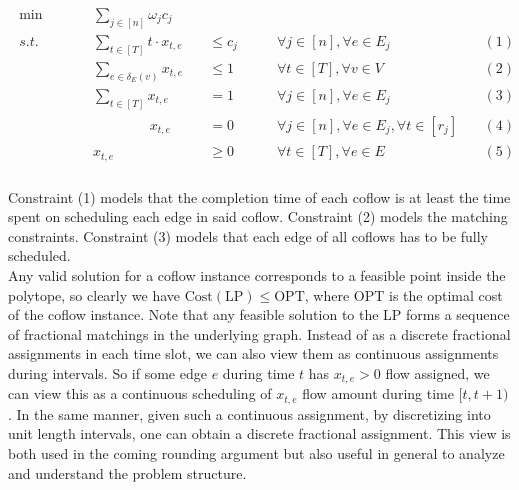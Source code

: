 \documentclass[11pt]{article}
\begin{document}
\begin{gather*}\label{lp:deadlines}\tag{LP D}
\begin{aligned}
\min\qquad &&\sum_{j \in [n]} \omega_jc_j  &~&&~\\
s.t.\qquad &&\sum_{t \in [T]}t\cdot x_{t,e} &\quad\le c_j \qquad&\forall j \in [n], \forall e \in E_j&& (1)\\
~&&\sum_{e \in \delta_E(v)}x_{t,e} &\quad\le 1\qquad &\forall t \in [T],\forall v \in V && (2)\\
~&&\sum_{t \in [T]} x_{t,e} &\quad= 1\qquad &\forall j \in [n], \forall e \in E_j && (3)\\
~&&\phantom{\sum_{x \in [T]}}x_{t,e} &\quad =  0\qquad &\forall j \in [n], \forall e \in E_j, \forall t \in [r_j] && (4)\\
~&&x_{t,e} &\quad\ge 0\qquad &\forall t \in [T], \forall e \in E && (5)
\end{aligned}
\end{gather*}
\vspace{0.2cm}\\

Constraint (1) models that the completion time of each coflow is at least the time spent on scheduling each edge in said coflow. Constraint (2) models the matching constraints. Constraint (3) models that each edge of all coflows has to be fully scheduled.\\
Any valid solution for a coflow instance corresponds to a feasible point inside the polytope, so clearly we have $\mathrm{Cost}(\mathrm{LP}) \le \mathrm{OPT}$, where $\mathrm{OPT}$ is the optimal cost of the coflow instance. Note that any feasible solution to the LP forms a sequence of fractional matchings in the underlying graph. Instead of as a discrete fractional assignments in each time slot, we can also view them as continuous assignments during intervals. So if some edge $e$ during time $t$ has $x_{t,e} > 0$ flow assigned, we can view this as a continuous scheduling of $x_{t,e}$ flow amount during time $[t,t+1)$. In the same manner, given such a continuous assignment, by discretizing into unit length intervals, one can obtain a discrete fractional assignment. This view is both used in the coming rounding argument but also useful in general to analyze and understand the problem structure. 
\end{document}
